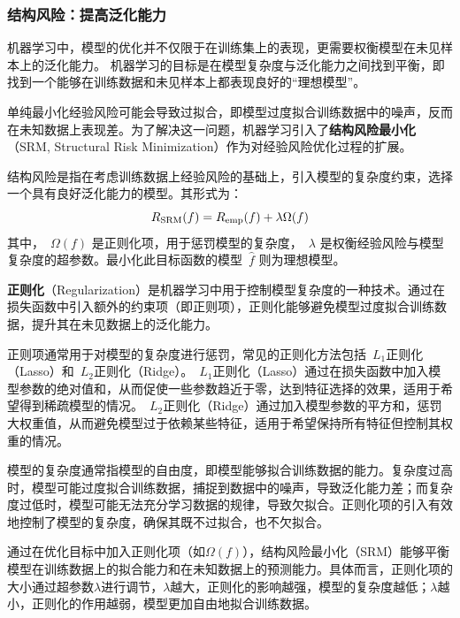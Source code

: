 \subsubsection{ 结构风险：提高泛化能力}

机器学习中，模型的优化并不仅限于在训练集上的表现，更需要权衡模型在未见样本上的泛化能力。
机器学习的目标是在模型复杂度与泛化能力之间找到平衡，即找到一个能够在训练数据和未见样本上都表现良好的“理想模型”。

单纯最小化经验风险可能会导致过拟合，即模型过度拟合训练数据中的噪声，反而在未知数据上表现差。为了解决这一问题，机器学习引入了{\bf 结构风险最小化}（SRM, Structural Risk Minimization）作为对经验风险优化过程的扩展。

\begin{definition}
结构风险是指在考虑训练数据上经验风险的基础上，引入模型的复杂度约束，选择一个具有良好泛化能力的模型。其形式为：
\begin{equation}\label{eq:SRM}
R_{\rm SRM}(f) = R_{\rm emp}(f) +\lambda \Omega(f)
\end{equation}
其中，~$\Omega(f)$ 是正则化项，用于惩罚模型的复杂度，~$\lambda$ 是权衡经验风险与模型复杂度的超参数。最小化此目标函数的模型~$\hat{f}$ 则为理想模型。 
\end{definition}

{\bf 正则化}（Regularization）是机器学习中用于控制模型复杂度的一种技术。通过在损失函数中引入额外的约束项（即正则项），正则化能够避免模型过度拟合训练数据，提升其在未见数据上的泛化能力。

正则项通常用于对模型的复杂度进行惩罚，常见的正则化方法包括~$L_1$正则化（Lasso）和~$L_2$正则化（Ridge）。~$L_1$正则化（Lasso）通过在损失函数中加入模型参数的绝对值和，从而促使一些参数趋近于零，达到特征选择的效果，适用于希望得到稀疏模型的情况。~$L_2$正则化（Ridge）通过加入模型参数的平方和，惩罚大权重值，从而避免模型过于依赖某些特征，适用于希望保持所有特征但控制其权重的情况。

模型的复杂度通常指模型的自由度，即模型能够拟合训练数据的能力。复杂度过高时，模型可能过度拟合训练数据，捕捉到数据中的噪声，导致泛化能力差；而复杂度过低时，模型可能无法充分学习数据的规律，导致欠拟合。正则化项的引入有效地控制了模型的复杂度，确保其既不过拟合，也不欠拟合。

通过在优化目标中加入正则化项（如$ \Omega(f) $），结构风险最小化（SRM）能够平衡模型在训练数据上的拟合能力和在未知数据上的预测能力。具体而言，正则化项的大小通过超参数$\lambda$进行调节，$\lambda$越大，正则化的影响越强，模型的复杂度越低；$\lambda$越小，正则化的作用越弱，模型更加自由地拟合训练数据。

